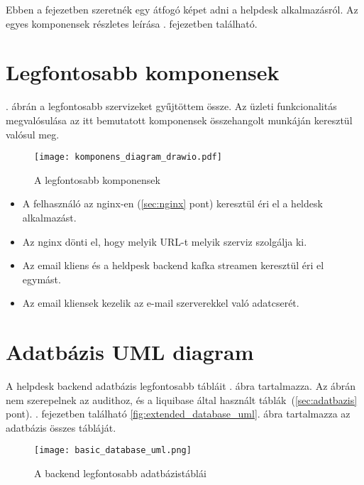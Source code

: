 Ebben a fejezetben szeretnék egy átfogó képet adni a helpdesk alkalmazásról. Az egyes komponensek részletes leírása . fejezetben található.

\section{Legfontosabb komponensek}

. ábrán a legfontosabb szervizeket gyűjtöttem össze. Az üzleti funkcionalitás megvalósulása az itt bemutatott komponensek összehangolt munkáján keresztül valósul meg.

\begin{figure}[hbt] 
	\centering
	\texttt{[image: komponens\_diagram\_drawio.pdf]}
	\caption{A legfontosabb komponensek}
	\label{fig:komponens_diagram}
\end{figure}


\begin{itemize}
	\item A felhasználó az nginx-en (\ref{sec:nginx} pont) keresztül éri el a heldesk alkalmazást.
	\item Az nginx dönti el, hogy melyik URL-t melyik szerviz szolgálja ki.
	\item Az email kliens és a heldpesk backend kafka streamen keresztül éri el egymást.
	\item Az email kliensek kezelik az e-mail szerverekkel való adatcserét.
\end{itemize}


\section{Adatbázis UML diagram}
A helpdesk backend adatbázis legfontosabb tábláit . ábra tartalmazza. Az ábrán nem szerepelnek az audithoz, és a liquibase által  használt táblák~(\ref{sec:adatbazis} pont). . fejezetben található \ref{fig:extended_database_uml}. ábra tartalmazza az adatbázis összes tábláját.
 


\begin{figure}[hbt] 
	\centering
	\texttt{[image: basic\_database\_uml.png]}
	\caption{A backend legfontosabb adatbázistáblái}
	\label{fig:basic_database_uml}
\end{figure}

